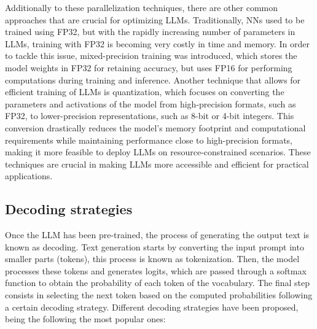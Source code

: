 \documentclass[11pt,english,listoffigures,listoftables]{tfgetsinf}
\begin{document}
Additionally to these parallelization techniques, there are other common approaches that are crucial for optimizing LLMs. Traditionally, NNs used to be trained using FP32, but with the rapidly increasing number of parameters in LLMs, training with FP32 is becoming very costly in time and memory. In order to tackle this issue, mixed-precision training \cite{micikevicius2017mixed} was introduced, which stores the model weights in FP32 for retaining accuracy, but uses FP16 for performing computations during training and inference. Another technique that allows for efficient training of LLMs is quantization, which focuses on converting the parameters and activations of the model from high-precision formats, such as FP32, to lower-precision representations, such as 8-bit \cite{dettmers2022int8} or 4-bit integers. This conversion drastically reduces the model's memory footprint and computational requirements while maintaining performance close to high-precision formats, making it more feasible to deploy LLMs on resource-constrained scenarios. These techniques are crucial in making LLMs more accessible and efficient for practical applications.


\subsection{Decoding strategies}

Once the LLM has been pre-trained, the process of generating the output text is known as decoding. Text generation starts by converting the input prompt into smaller parts (tokens), this process is known as tokenization. Then, the model processes these tokens and generates logits, which are passed through a softmax function to obtain the probability of each token of the vocabulary. The final step consists in selecting the next token based on the computed probabilities following a certain decoding strategy. Different decoding strategies have been proposed, being the following the most popular ones:
\end{document}
